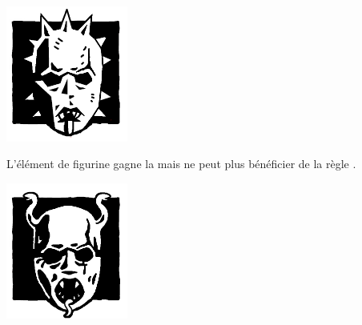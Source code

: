 \newcommand{\logosize}{4cm}
\begin{multicols}{2}\raggedcolumns
\begin{center}
\includegraphics[width=\logosize]{pics/cultofnabh.png}
\armyspecialruleentry{\cultofnabh}

L'élément de figurine gagne la \hatred{} mais ne peut plus bénéficier de la règle \killerinstinct{}.
\end{center}

\begin{center}
\includegraphics[width=\logosize]{pics/cultofyema.png}
\armyspecialruleentry{\cultofyema}


\end{center}
\end{multicols}
